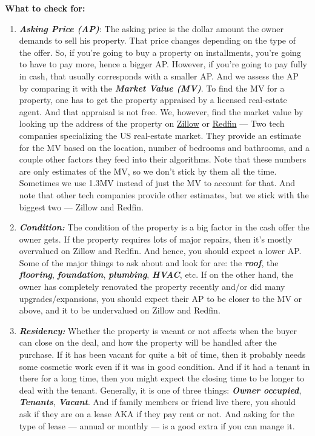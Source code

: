 \documentclass[12pt]{article}
\newcommand{\bb}[1]{\textbf{\textit{#1}}}
\begin{document}
\newpage
    {\Large\textbf{What to check for:}}
    \vspace{1em}
\begin{enumerate}[label= \roman*.]
    \item \bb{Asking Price (AP)}:
    The asking price is the dollar amount the owner demands to sell his property. That price changes depending on the type of the offer. So, if you're going to buy a property on installments, you're going to have to pay more, hence a bigger AP\@. However, if you're going to pay fully in cash, that usually corresponds with a smaller AP\@. And we assess the AP by comparing it with the \bb{Market Value (MV)}. To find the MV for a property, one has to get the property appraised by a licensed real-estate agent. And that appraisal is not free. We, however, find the market value by looking up the address of the property on \href{zillow.com}{Zillow} or \href{redfin.com}{Redfin} --- Two tech companies specializing the US real-estate market. They provide an estimate for the MV based on the location, number of bedrooms and bathrooms, and a couple other factors they feed into their algorithms. Note that these numbers are only estimates of the MV, so we don't stick by them all the time. Sometimes we use 1.3MV instead of just the MV to account for that. And note that other tech companies provide other estimates, but we stick with the biggest two --- Zillow and Redfin.
    

    \item \bb{Condition:}
    The condition of the property is a big factor in the cash offer the owner gets. If the property requires lots of major repairs, then it's mostly overvalued on Zillow and Redfin. And hence, you should expect a lower AP\@. Some of the major things to ask about and look for are: the \bb{roof}, the \bb{flooring}, \bb{foundation}, \bb{plumbing}, \bb{HVAC}, etc. If on the other hand, the owner has completely renovated the property recently and/or did many upgrades/expansions, you should expect their AP to be closer to the MV or above, and it to be undervalued on Zillow and Redfin.

    \item \bb{Residency:}
    Whether the property is vacant or not affects when the buyer can close on the deal, and how the property will be handled after the purchase. If it has been vacant for quite a bit of time, then it probably needs some cosmetic work even if it was in good condition. And if it had a tenant in there for a long time, then you might expect the closing time to be longer to deal with the tenant. Generally, it is one of three things: \bb{Owner occupied}, \bb{Tenants}, \bb{Vacant}. And if family members or friend live there, you should ask if they are on a lease AKA if they pay rent or not. And asking for the type of lease --- annual or monthly --- is a good extra if you can mange it.


\end{enumerate}
\end{document}
